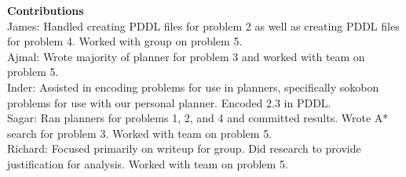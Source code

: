 \documentclass[]{article}
\begin{document}
	\clearpage 
	\textbf{Contributions}\\
	
	James: Handled creating PDDL files for problem 2 as well as creating PDDL files for problem 4.  Worked with group on problem 5.\\
	
	Ajmal: Wrote majority of planner for problem 3 and worked with team on problem 5.\\
	
	Inder: Assisted in encoding problems for use in planners, specifically sokobon problems for use with our personal planner.  Encoded 2.3 in PDDL.\\
	
	Sagar: Ran planners for problems 1, 2, and 4 and committed results. Wrote A* search for problem 3. Worked with team on problem 5.\\
	
	Richard: Focused primarily on writeup for group.  Did research to provide justification for analysis.  Worked with team on problem 5.\\
	
\end{document}
